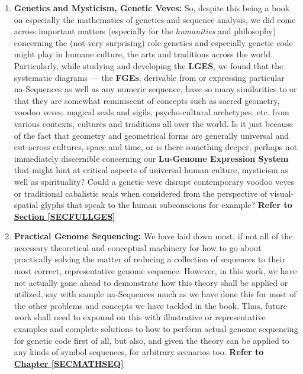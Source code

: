 \documentclass[a4paper, 18pt]{book} %
\begin{document}
\begin{enumerate}
\item \textbf{Genetics and Mysticism, Genetic Veves:} So, despite this being a book on especially the mathematics of genetics and sequence analysis, we did come across important matters (especially for the \textit{humanities} and philosophy) concerning the (not-very surprising) role genetics and especially genetic code might play in humane culture, the arts and traditions across the world. Particularly, while studying and developing the \textbf{LGES}, we found that the systematic diagrams --- the \textbf{FGEs}, derivable from or expressing particular na-Sequences as well as any numeric sequence, have so many similarities to or that they are somewhat reminiscent of concepts such as sacred geometry, voodoo veves, magical seals and sigils, psycho-cultural archetypes, etc. from various contexts, cultures and traditions all over the world. Is it just because of the fact that geometry and geometrical forms are generally universal and cut-across cultures, space and time, or is there something deeper, perhaps not immediately discernible concerning our \textbf{Lu-Genome Expression System} that might hint at critical aspects of universal human culture, mysticism as well as spirituality? Could a genetic veve disrupt contemporary voodoo veves or traditional cabalistic seals when considered from the perspective of visual-spatial glyphs that speak to the human subconscious for example? \textbf{Refer to \textbf{\hyperref[SECFULLGES]{Section \ref{SECFULLGES}}}} 


\item \textbf{Practical Genome Sequencing:} We have laid down most, if not all of the necessary theoretical and conceptual machinery for how to go about practically solving the matter of reducing a collection of sequences to their most correct, representative genome sequence. However, in this work, we have not actually gone ahead to demonstrate how this theory shall be applied or utilized, say with sample na-Sequences much as we have done this for most of the other problems and concepts we have tackled in the book. Thus, future work shall need to expound on this with illustrative or representative examples and complete solutions to how to perform actual genome sequencing for genetic code first of all, but also, and given the theory can be applied to any kinds of symbol sequences, for arbitrary scenarios too.  \textbf{Refer to \textbf{\hyperref[SECMATHSEQ]{Chapter \ref{SECMATHSEQ}}}} 


\end{enumerate}
\end{document}
